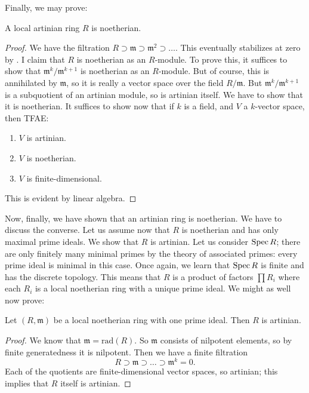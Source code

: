 Finally, we may prove:

\begin{lemma} 
A local artinian ring $R$ is noetherian.
\end{lemma} 
\begin{proof} 
We have the filtration $R \supset \mathfrak{m} \supset \mathfrak{m}^2 \supset
\dots$. This eventually stabilizes at zero by . I
claim that $R$ is noetherian as an $R$-module. To prove this, it suffices to
show that $\mathfrak{m}^k/\mathfrak{m}^{k+1}$ is noetherian as an $R$-module.
But of course, this is annihilated by $\mathfrak{m}$, so it is really a vector
space over the field $R/\mathfrak{m}$. But $\mathfrak{m}^k/\mathfrak{m}^{k+1}$
is a subquotient of an artinian module, so is artinian itself. We have to show
that it is noetherian. 
It suffices to show now that if $k$ is a field, and $V$ a $k$-vector space,
then TFAE:
\begin{enumerate}
\item $V$ is artinian. 
\item $V$ is noetherian.
\item $V$ is finite-dimensional.
\end{enumerate}
This is evident by linear algebra. 	
\end{proof} 

Now, finally, we have shown that an artinian ring is noetherian. We have to
discuss the converse. Let us assume now that $R$ is noetherian and has only
maximal prime ideals. We show that $R$ is artinian. Let us consider $\operatorname{Spec} R$;
there are only finitely many minimal primes by the theory of associated
primes: every prime ideal is minimal in this case. Once again, we learn that $\operatorname{Spec} R$
is finite and has the discrete topology. This means that $R$ is a product of
factors $\prod R_i$ where each $R_i$ is a local noetherian ring with a unique
prime ideal. We might as well now prove:

\begin{lemma} 
Let $(R, \mathfrak{m})$ be a local noetherian ring with one prime ideal. Then
$R$ is artinian.
\end{lemma} 
\begin{proof} 
We know that $\mathfrak{m} = \mathrm{rad}(R)$. So $\mathfrak{m}$ consists of
nilpotent elements, so by finite generatedness it is nilpotent.  Then we have a
finite filtration
\[ R \supset \mathfrak{m} \supset \dots \supset \mathfrak{m}^k = 0.  \]
Each of the quotients are finite-dimensional vector spaces, so artinian; this
implies that $R$ itself is artinian. 
\end{proof} 

